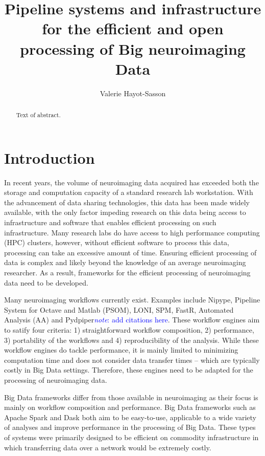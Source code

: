 \documentclass{report}
\newcommand{\note}[1]{\textcolor{blue}{\textit{note}: #1}}
\begin{document}
 
    \title{Pipeline systems and infrastructure for the efficient
            and open processing of Big neuroimaging Data} 
    \author{Valerie Hayot-Sasson}
    \maketitle 
    
    \begin{abstract} Text of abstract.  
    \end{abstract} 
    \tableofcontents
    \chapter{Introduction}
        In recent years, the volume of neuroimaging data acquired has exceeded
        both the storage and computation capacity of a standard research 
        lab workstation. With the advancement of data sharing technologies, this 
        data has been made widely available, with the only factor impeding
        research on this data being access to infrastructure and software that 
        enables efficient processing on such infrastructure. Many research labs 
        do have access to high performance computing (HPC) clusters, however, 
        without efficient software to process this data, processing can take an 
        excessive amount of time. Ensuring efficient processing of data is 
        complex and likely beyond the knowledge of an average neuroimaging 
        researcher. As a result, frameworks for the efficient processing of 
        neuroimaging data need to be developed.

        Many neuroimaging workflows currently exist. Examples include
        Nipype, Pipeline System for Octave and Matlab (PSOM), LONI, SPM, FastR,
        Automated Analysis (AA) and Pydpiper\note{add citations here}. These 
        workflow engines aim to satify four criteria: 1) straightforward 
        workflow composition, 2) performance, 3) portability of the workflows 
        and 4) reproducibility of the analysis. While these workflow engines
        do tackle performance, it is mainly limited to minimizing computation
        time and does not consider data transfer times -- which are typically
        costly in Big Data settings. Therefore, these engines need to be adapted
        for the processing of neuroimaging data.

        Big Data frameworks differ from those available in neuroimaging as their
        focus is mainly on workflow composition and performance. Big Data 
        frameworks such as Apache Spark and Dask both aim to be easy-to-use,
        applicable to a wide variety of analyses and improve performance in the 
        processing of Big Data. These types of systems were primarily designed 
        to be efficient on commodity infrastructure in which transferring data
        over a network would be extremely costly.
\end{document}
